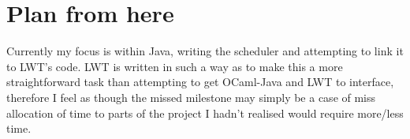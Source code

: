 \documentclass[a4paper]{article}
\begin{document}
\section{Plan from here}
Currently my focus is within Java, writing the scheduler and attempting to link it to LWT's code. LWT is written in such a way as to make this a more straightforward task than attempting to get OCaml-Java and LWT to interface, therefore I feel as though the missed milestone may simply be a case of miss allocation of time to parts of the project I hadn't realised would require more/less time.
\end{document}
